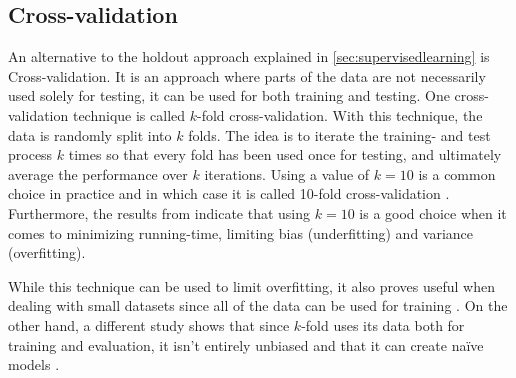 	\subsection{Cross-validation} \label{sec:crossval}
	 An alternative to the holdout approach explained in \ref{sec:supervisedlearning} is Cross-validation. It is an approach where parts of the data are not necessarily used solely for testing, it can be used for both training and testing. %
One cross-validation technique is called $k$-fold cross-validation. With this technique, the data is randomly split into $k$ folds. The idea is to iterate the training- and test process $k$ times so that every fold has been used once for testing, and ultimately average the performance over $k$ iterations. Using a value of $k = 10$ is a common choice in practice and in which case it is called 10-fold cross-validation \cite{ARTICLE:4}. Furthermore, the results from \cite{BOOK:4} indicate that using $k=10$ is a good choice when it comes to minimizing running-time, limiting bias (underfitting) and variance (overfitting). 

	While this technique can be used to limit overfitting, it also proves useful when dealing with small datasets since all of the data can be used for training \cite{ARTICLE:4}.  On the other hand, a different study shows that since $k$-fold uses its data both for training and evaluation, it isn't entirely unbiased and that it can create naïve models \cite{ARTICLE:25}. %





